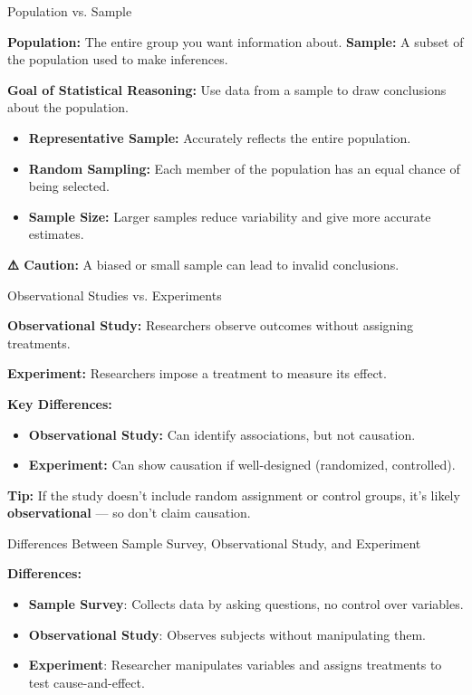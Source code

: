\documentclass{beamer}
\begin{document}
\begin{frame}{Population vs. Sample}
\small

\textbf{Population:}  
The entire group you want information about.  
\textbf{Sample:}  
A subset of the population used to make inferences.

\vspace{0.2cm}
\textbf{Goal of  Statistical Reasoning:}  
Use data from a sample to draw conclusions about the population.

\begin{itemize}
    \item \textbf{Representative Sample:} Accurately reflects the entire population.
    \item \textbf{Random Sampling:} Each member of the population has an equal chance of being selected.
    \item \textbf{Sample Size:} Larger samples reduce variability and give more accurate estimates.
\end{itemize}

\textbf{⚠️ Caution:} A biased or small sample can lead to invalid conclusions.

\end{frame}

\begin{frame}{Observational Studies vs. Experiments}
\small

\textbf{Observational Study:}  
Researchers observe outcomes without assigning treatments.

\textbf{Experiment:}  
Researchers impose a treatment to measure its effect.

\vspace{0.2cm}
\textbf{Key Differences:}
\begin{itemize}
    \item \textbf{Observational Study:} Can identify associations, but not causation.
    \item \textbf{Experiment:} Can show causation if well-designed (randomized, controlled).
\end{itemize}

\vspace{0.2cm}
\textbf{ Tip:}  
If the study doesn’t include random assignment or control groups, it's likely \textbf{observational} — so don’t claim causation.

\end{frame}

\begin{frame}{Differences Between Sample Survey, Observational Study, and Experiment}

\textbf{Differences:}
\begin{itemize}
    \item \textbf{Sample Survey}: Collects data by asking questions, no control over variables.
    \item \textbf{Observational Study}: Observes subjects without manipulating them.
    \item \textbf{Experiment}: Researcher manipulates variables and assigns treatments to test cause-and-effect.
\end{itemize}



\end{frame}
\end{document}
